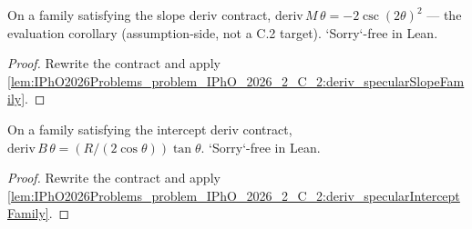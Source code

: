 \begin{lemma}
\label{lem:IPhO2026Problems_problem_IPhO_2026_2_C_2:slope_deriv_of_contract}
On a family satisfying the slope deriv contract,
$\mathrm{deriv}\,M\,\theta = -2\csc(2\theta)^{2}$ --- the evaluation
corollary (assumption-side, not a C.2 target).  `Sorry`-free in Lean.
\end{lemma}
\begin{proof}
Rewrite the contract and apply
\cref{lem:IPhO2026Problems_problem_IPhO_2026_2_C_2:deriv_specularSlopeFamily}.
\end{proof}

\begin{lemma}
\label{lem:IPhO2026Problems_problem_IPhO_2026_2_C_2:intercept_deriv_of_contract}
On a family satisfying the intercept deriv contract,
$\mathrm{deriv}\,B\,\theta = (R/(2\cos\theta))\tan\theta$.
`Sorry`-free in Lean.
\end{lemma}
\begin{proof}
Rewrite the contract and apply
\cref{lem:IPhO2026Problems_problem_IPhO_2026_2_C_2:deriv_specularInterceptFamily}.
\end{proof}
